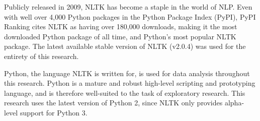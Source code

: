 Publicly released in 2009, NLTK has become a staple in the world of NLP.
Even with well over 4,000 Python packages in the Python Package Index (PyPI), PyPI Ranking cites NLTK as having over 180,000 downloads, making it the  most downloaded Python package of all time, and Python's most popular NLTK package\cite{pypi-ranking}.
The latest available stable version of NLTK (v2.0.4) was used for the entirety of this research.

Python, the language NLTK is written for, is used for data analysis throughout this research.
Python is a mature and robust high-level scripting and prototyping language, and is therefore well-suited to the task of exploratory research.
This research uses the latest version of Python 2, since NLTK only provides alpha-level support for Python 3\cite{nltk-install}.